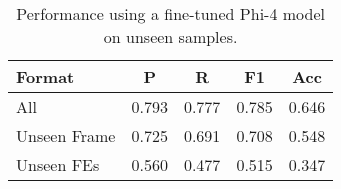 \begin{table}
    \centering
    \begin{tabular}{lcccc}
        \hline
        \textbf{Format} & \textbf{P} & \textbf{R} & \textbf{F1} & \textbf{Acc} \\ 
        \hline
        All             & 0.793 & 0.777 & 0.785 & 0.646 \\ 
        Unseen Frame    & 0.725 & 0.691 & 0.708 & 0.548 \\ 
        Unseen FEs      & 0.560 & 0.477 & 0.515 & 0.347 \\ 
        \hline
    \end{tabular}
    \caption{Performance using a fine-tuned Phi-4 model on unseen samples.}
    \label{tab:unseen}
\end{table}